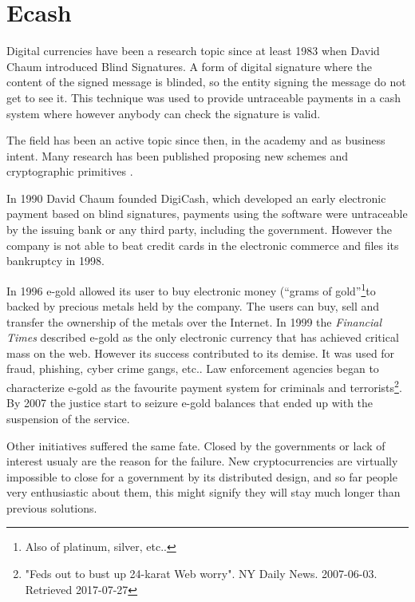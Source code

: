 \section{Ecash}
Digital currencies have been a research topic since at least 1983 when David
  Chaum\cite{chaum1983blind} introduced Blind Signatures. A form of digital
  signature where the content of the signed message is blinded, so the entity
  signing the message do not get to see it. This technique was used to provide
  untraceable payments in a cash system where however anybody can check the
  signature is valid.

The field has been an active topic since then, in the academy and as business
  intent. Many research has been published proposing new schemes and
  cryptographic primitives\cite{okamoto1991universal}\cite{chaum1992achieving}
  \cite{boly1994esprit}\cite{anderson1996netcard}\cite{lysyanskaya1998group}.

In 1990 David Chaum founded DigiCash, which developed an early electronic
  payment based on blind signatures, payments using the software were
  untraceable by the issuing bank or any third party, including the government.
However the company is not able to beat credit cards in the electronic
  commerce and files its bankruptcy in 1998.

In 1996 e-gold allowed its user to buy electronic money (``grams of
  gold''\footnote{Also of platinum, silver, etc..}to backed by precious
  metals held by the company.\cite{hughes2007developments}
The users can buy, sell and transfer the ownership of the metals over the
  Internet. In 1999 the \textit{Financial Times} described e-gold as the only
  electronic currency that has achieved critical mass on the web.
However its success contributed to its demise. It was used for fraud, phishing,
  cyber crime gangs, etc.. Law enforcement agencies began to characterize
  e-gold as the favourite payment system for criminals and terrorists\footnote{
  "Feds out to bust up 24-karat Web worry". NY Daily News. 2007-06-03. Retrieved
  2017-07-27}. By 2007 the justice start to seizure e-gold balances that ended up
  with the suspension of the service.

Other initiatives suffered the same fate. Closed by the governments or lack of
  interest usualy are the reason for the failure.
New cryptocurrencies are virtually impossible to close for a government by its
  distributed design, and so far people very enthusiastic about them, this
  might signify they will stay much longer than previous solutions.
